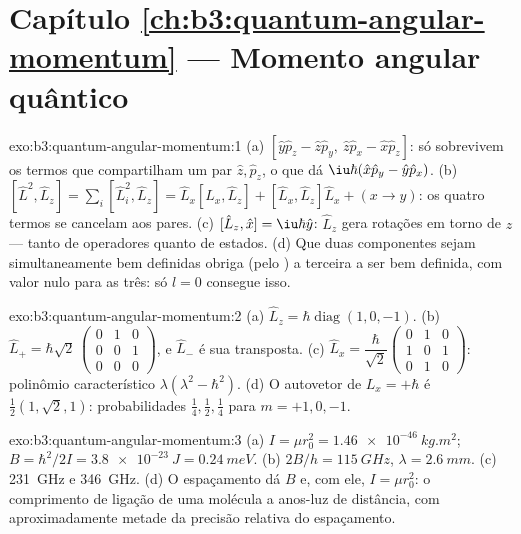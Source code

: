 \section*{Capítulo \ref{ch:b3:quantum-angular-momentum} --- Momento angular quântico}

\begin{solution}{exo:b3:quantum-angular-momentum:1}
(a) $[\hat y\hat p_z - \hat z\hat p_y,\ \hat z\hat p_x - \hat x\hat
p_z]$: só sobrevivem os termos que compartilham um par $\hat z, \hat p_z$,
o que dá $\iu\hbar(\hat x\hat p_y - \hat y\hat p_x)$. (b) $[\hat
L^2, \hat L_z] = \sum_i[\hat L_i^2, \hat L_z] = \hat L_x[\hat L_x,
\hat L_z] + [\hat L_x, \hat L_z]\hat L_x + (x \to y)$: os quatro
termos se cancelam aos pares. (c) $[\hat L_z, \hat x] = \iu\hbar\hat y$:
$\hat L_z$ gera rotações em torno de $z$ --- tanto de operadores
quanto de estados. (d) Que duas componentes sejam simultaneamente bem
definidas obriga (pelo ) a terceira a ser bem definida, com
valor nulo para as três: só $l = 0$ consegue isso.
\end{solution}

\begin{solution}{exo:b3:quantum-angular-momentum:2}
(a) $\hat L_z = \hbar\operatorname{diag}(1, 0, -1)$. (b) $\hat L_+ =
\hbar\sqrt2\,\begin{pmatrix}0&1&0\\0&0&1\\0&0&0
\end{pmatrix}$, e $\hat L_-$ é sua transposta. (c) $\hat L_x =
\dfrac{\hbar}{\sqrt2}\begin{pmatrix}0&1&0\\1&0&1\\0&1&0
\end{pmatrix}$: polinômio característico $\lambda(\lambda^2 -
\hbar^2)$. (d) O autovetor de $L_x = +\hbar$ é $\tfrac12(1,
\sqrt2, 1)$: probabilidades $\tfrac14, \tfrac12, \tfrac14$ para $m =
+1, 0, -1$.
\end{solution}

\begin{solution}{exo:b3:quantum-angular-momentum:3}
(a) $I = \mu r_0^2 = \qty{1.46e-46}{kg.m^2}$; $B = \hbar^2/2I =
\qty{3.8e-23}{J} = \qty{0.24}{meV}$. (b) $2B/h = \qty{115}{GHz}$,
$\lambda = \qty{2.6}{mm}$. (c) \qty{231}{GHz} e \qty{346}{GHz}.
(d) O espaçamento dá $B$ e, com ele, $I = \mu r_0^2$: o comprimento de
ligação de uma molécula a anos-luz de distância, com aproximadamente
metade da precisão relativa do espaçamento.
\end{solution}

